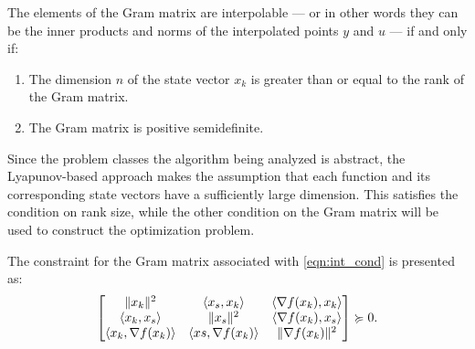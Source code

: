 The elements of the Gram matrix are interpolable --- or in other words they can be the inner products and norms of the interpolated points $y$ and $u$ --- if and only if:

\begin{enumerate}
	\item The dimension $n$ of the state vector $x_k$ is greater than or equal to the rank of the Gram matrix.
	\item The Gram matrix is positive semidefinite.
\end{enumerate}

Since the problem classes the algorithm being analyzed is abstract, the Lyapunov-based approach makes the assumption that each function and its corresponding state vectors have a sufficiently large dimension. This satisfies the condition on rank size, while the other condition on the Gram matrix will be used to construct the optimization problem.

The constraint for the Gram matrix associated with \eqref{eqn:int_cond} is presented as:
\begin{equation} \label{eqn:trans_cond}
		\begin{bmatrix}\|x_k\|^2 & \langle x_s, x_k \rangle & \langle \nabla f(x_k), x_k \rangle \\ \langle x_k, x_s \rangle & \|x_s\|^2 & \langle \nabla f(x_k), x_s \rangle \\ \langle x_k, \nabla f(x_k) \rangle & \langle xs, \nabla f(x_k) \rangle & \|\nabla f(x_k)\|^2\end{bmatrix} \succcurlyeq 0.
	\end{equation}



